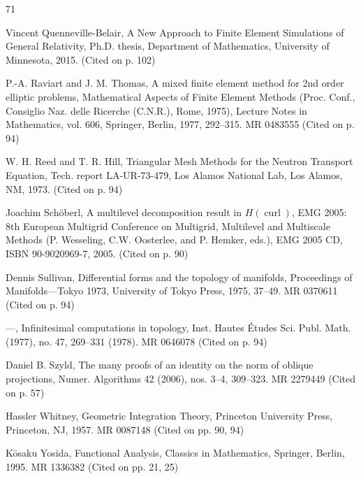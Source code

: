 \begin{MBSourceBibliography}{71}
\item\label{bib:source-63}Vincent Quenneville-Belair, A New Approach to Finite Element Simulations of General Relativity, Ph.D. thesis, Department of Mathematics, University of Minnesota, 2015. (Cited on p. 102)

\item\label{bib:source-64}P.-A. Raviart and J. M. Thomas, A mixed finite element method for 2nd order elliptic problems, Mathematical Aspects of Finite Element Methods (Proc. Conf., Consiglio Naz. delle Ricerche (C.N.R.), Rome, 1975), Lecture Notes in Mathematics, vol. 606, Springer, Berlin, 1977, 292–315. MR 0483555 (Cited on p. 94)

\item\label{bib:source-65}W. H. Reed and T. R. Hill, Triangular Mesh Methods for the Neutron Transport Equation, Tech. report LA-UR-73-479, Los Alamos National Lab, Los Alamos, NM, 1973. (Cited on p. 94)

\item\label{bib:source-66}Joachim Schöberl, A multilevel decomposition result in $H(\operatorname{curl})$, EMG 2005: 8th European Multigrid Conference on Multigrid, Multilevel and Multiscale Methods (P. Wesseling, C.W. Oosterlee, and P. Hemker, eds.), EMG 2005 CD, ISBN 90-9020969-7, 2005. (Cited on p. 90)

\item\label{bib:source-67}Dennis Sullivan, Differential forms and the topology of manifolds, Proceedings of Manifolds—Tokyo 1973, University of Tokyo Press, 1975, 37–49. MR 0370611 (Cited on p. 94)

\item\label{bib:source-68}—, Infinitesimal computations in topology, Inst. Hautes Études Sci. Publ. Math. (1977), no. 47, 269–331 (1978). MR 0646078 (Cited on p. 94)

\item\label{bib:source-69}Daniel B. Szyld, The many proofs of an identity on the norm of oblique projections, Numer. Algorithms 42 (2006), nos. 3–4, 309–323. MR 2279449 (Cited on p. 57)

\item\label{bib:source-70}Hassler Whitney, Geometric Integration Theory, Princeton University Press, Princeton, NJ, 1957. MR 0087148 (Cited on pp. 90, 94)

\item\label{bib:source-71}Kōsaku Yosida, Functional Analysis, Classics in Mathematics, Springer, Berlin, 1995. MR 1336382 (Cited on pp. 21, 25)
\end{MBSourceBibliography}
